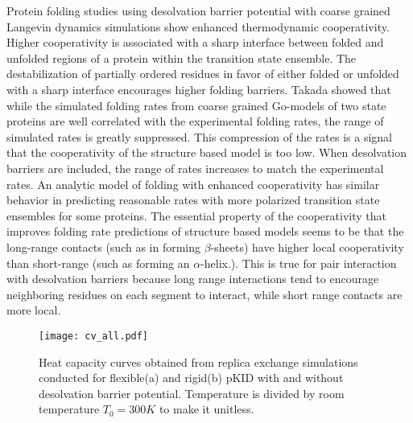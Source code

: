 \documentclass[../talant.diss.submit.tex]{subfiles}
\begin{document}
Protein folding studies using desolvation barrier potential with coarse grained Langevin dynamics
simulations show enhanced thermodynamic cooperativity\cite{liu:05}. Higher cooperativity
is associated with a sharp interface between folded and unfolded regions of a protein within
the transition state ensemble. The destabilization of partially ordered residues in favor of either
folded or unfolded with a sharp interface encourages higher folding barriers. Takada showed that
while the simulated folding rates from coarse grained Go-models  of two state proteins are well
correlated with the experimental folding rates, the range of simulated rates is greatly suppressed.\cite{koga:01}
This compression of the rates is a signal that the cooperativity of the structure based model is
too low.\cite{qi:08}
When desolvation barriers are included, the range of rates increases to match the experimental
rates.\cite{kaya:03,kaya:05,kaya:13,liu:05}
An analytic model of folding with enhanced cooperativity has similar behavior in predicting
reasonable rates with more polarized transition state ensembles for some proteins.\cite{qi:08}
The essential property of the cooperativity that improves folding rate predictions
of structure based models seems to be that the long-range contacts
(such as in forming $\beta$-sheets) have higher local cooperativity than short-range
(such as forming an $\alpha$-helix.).\cite{portman:10} This is true for pair interaction with
desolvation barriers because long range interactions tend
to encourage neighboring residues on each segment to interact, while short range contacts are more local.\cite{portman:10}

        
\begin{figure}[h!]
  \begin{centering}
    \texttt{[image: cv\_all.pdf]}
    \caption{Heat capacity curves obtained from replica exchange simulations
      conducted for flexible(a) and rigid(b) pKID with and without desolvation
      barrier potential. Temperature is divided by room temperature $T_{0} = 300K$
      to make it unitless.}                
    \label{fig:cv_all}                                                                                  
  \end{centering}                                                                                          
\end{figure}
\end{document}
